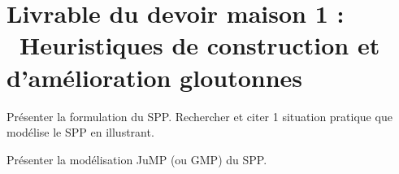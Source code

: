 
\section*{Livrable du devoir maison 1 : \\ Heuristiques de construction et d'amélioration gloutonnes}

%
%

\vspace{5mm}
\noindent
{}
\vspace{2mm}

\noindent
Présenter la formulation du SPP. Rechercher et citer 1 situation pratique que modélise le SPP en illustrant.

%
%

\vspace{5mm}
\noindent
{}
\vspace{2mm}

\noindent
Présenter la modélisation JuMP (ou GMP) du SPP.

%
%

\vspace{5mm}
\noindent
{}
\vspace{2mm}

